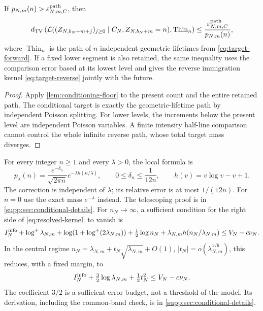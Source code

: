 \begin{theorem}\label{thm:resolved-kernel}
If $p_{N,m}(n)>\varepsilon_{N,m,C}^{\rm path}$, then
\begin{equation}\label{eq:resolved-kernel}
 d_{\mathrm{TV}}\left(\mathcal L((Z_{N,b_N+m+j})_{j\ge0}\mid C_N,Z_{N,b_N+m}=n),
                     \operatorname{Thin}_n\right)
 \le\frac{\varepsilon_{N,m,C}^{\rm path}}{p_{N,m}(n)},
\end{equation}
where $\operatorname{Thin}_n$ is the path of $n$ independent geometric
lifetimes from \eqref{eq:target-forward}. If a fixed lower segment is also
retained, the same inequality uses the comparison error based at its
lowest level and gives the reverse immigration kernel
\eqref{eq:target-reverse} jointly with the future.
\end{theorem}
\begin{proof}
Apply \cref{lem:conditioning-floor} to the present count and the entire
retained path. The conditional target is exactly the geometric-lifetime
path by independent Poisson splitting. For lower levels, the increments
below the present level are independent Poisson variables. A finite
intensity half-line comparison cannot control the whole infinite reverse
path, whose total target mass diverges.
\end{proof}
For every integer $n\ge1$ and every $\lambda>0$, the local formula is
\[
 p_\lambda(n)=\frac{e^{-\delta_n}}{\sqrt{2\pi n}}
                 e^{-\lambda h(n/\lambda)},\qquad
 0\le\delta_n\le\frac1{12n},\qquad h(v)=v\log v-v+1.
\]
The correction is independent of $\lambda$; its relative error is at most
$1/(12n)$. For $n=0$ use the exact mass $e^{-\lambda}$ instead.
The telescoping proof is in \cref{supp:sec:conditional-details}.
For $n_N\to\infty$, a sufficient condition for the right side of
\eqref{eq:resolved-kernel} to vanish is
\begin{equation}\label{eq:resolved-budget}
 I_N^{\rm info}+\log^+\lambda_{N,m}
 +\log(1+\log^+(2\lambda_{N,m}))
 +\tfrac12\log n_N+\lambda_{N,m}h(n_N/\lambda_{N,m})
 \le V_N-c\nu_N.
\end{equation}
In the central regime $n_N=\lambda_{N,m}+t_N\sqrt{\lambda_{N,m}}+O(1)$,
$|t_N|=o(\lambda_{N,m}^{1/6})$, this reduces, with a fixed margin, to
\[
 I_N^{\rm info}+\tfrac32\log\lambda_{N,m}+\tfrac12t_N^2
 \le V_N-c\nu_N.
\]
The coefficient $3/2$ is a sufficient error budget, not a threshold of the
model. Its derivation, including the common-band check, is in
\cref{supp:sec:conditional-details}.

